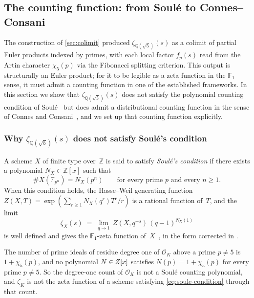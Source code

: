 \subsection{The counting function: from Soul\'e to Connes--Consani}
\label{sec:counting}

The construction of \cref{sec:colimit} produced
$\zeta_{\mathbb{Q}(\sqrt{5})}(s)$ as a colimit of partial Euler
products indexed by primes, with each local factor $f_p(s)$ read
from the Artin character $\chi_5(p)$ via the Fibonacci splitting
criterion.  This output is structurally an Euler product; for it
to be legible as a zeta function in the $\mathbb{F}_1$ sense, it
must admit a counting function in one of the established
frameworks.  In this section we show that
$\zeta_{\mathbb{Q}(\sqrt{5})}(s)$ does not satisfy the polynomial
counting condition of Soul\'e~\cite{soule03} but does admit a
distributional counting function in the sense of Connes and
Consani~\cite{connesconsani10}, and we set up that counting
function explicitly.

\subsubsection{Why $\zeta_{\mathbb{Q}(\sqrt{5})}(s)$ does not satisfy
Soul\'e's condition}\label{ssec:not-soule}

\begin{definition}\label{def:soule-condition}
A scheme $X$ of finite type over~$\mathbb{Z}$ is said to satisfy
\emph{Soul\'e's condition} if there exists a polynomial
$N_X\in\mathbb{Z}[x]$ such that
\begin{equation}\label{eq:soule-condition}
  \#X(\mathbb{F}_{p^n}) = N_X(p^n)
  \qquad\text{for every prime } p\text{ and every } n\ge 1.
\end{equation}
When this condition holds, the Hasse--Weil generating function
$Z(X,T) = \exp\!\left(\sum_{r\ge 1} N_X(q^r)T^r/r\right)$ is a
rational function of~$T$, and the limit
\begin{equation}\label{eq:soule-zeta}
  \zeta_X(s) \;=\; \lim_{q\to 1}\,Z(X,q^{-s})\,(q-1)^{N_X(1)}
\end{equation}
is well defined and gives the $\mathbb{F}_1$-zeta function of~$X$~\cite[\S6]{soule03}, in the form corrected in \cite[Eq.~(3)]{connesconsani10}.
\end{definition}

\begin{proposition}
\label{prop:not-soule}
The number of prime ideals of residue degree one of $\mathcal O_K$ above a prime
$p\ne5$ is $1+\chi_5(p)$, and no polynomial $N\in Z[x]$ satisfies $N(p)=1+\chi_5(p)$ for
every prime $p\ne5$.  So the degree-one count of $\mathcal O_K$ is not a Soul\'e counting
polynomial, and $\zeta_K$ is not the zeta function of a scheme satisfying
\eqref{eq:soule-condition} through that count.
\end{proposition}

